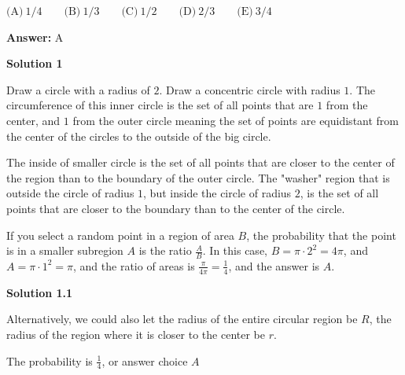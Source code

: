 \begin{enumerate}
 $\text{(A)}\ 1/4 \qquad \text{(B)}\ 1/3 \qquad \text{(C)}\ 1/2 \qquad \text{(D)}\ 2/3 \qquad \text{(E)}\ 3/4$

 \textbf{Answer: }A



\textbf{Solution 1}

Draw a circle with a radius of $2$.  Draw a concentric circle with radius $1$.  The circumference of this inner circle is the set of all points that are $1$ from the center, and $1$ from the outer circle meaning the set of points are equidistant from the center of the circles to the outside of the big circle.  

 The inside of smaller circle is the set of all points that are closer to the center of the region than to the boundary of the outer circle.  The "washer" region that is outside the circle of radius $1$, but inside the circle of radius $2$, is the set of all points that are closer to the boundary than to the center of the circle.

 If you select a random point in a region of area $B$, the probability that the point is in a smaller subregion $A$ is the ratio $\frac{A}{B}$.  In this case, $B = \pi\cdot 2^2 = 4\pi$, and $A = \pi\cdot 1^2 = \pi$, and the ratio of areas is $\frac{\pi}{4\pi} = \frac{1}{4}$, and the answer is $\boxed{A}$.

 



\textbf{Solution 1.1}

Alternatively, we could also let the radius of the entire circular region be $R$, the radius of the region where it is closer to the center be $r$.

 The probability is $\frac{1}{4}$, or answer choice $\boxed{A}$



\end{enumerate}